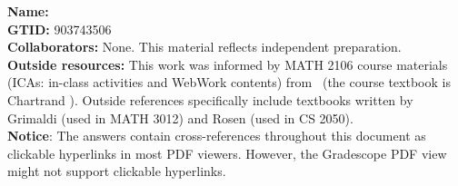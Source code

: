 {\large
  \noindent
  \textbf{Name:} \HandoutAuthor \smallskip \\

  \noindent
  \textbf{GTID:} 903743506 \smallskip \\

  \noindent
  \textbf{Collaborators:} None. This material reflects independent preparation. \smallskip \\

  \noindent
  \textbf{Outside resources:} This work was informed by MATH 2106 course materials 
  (ICAs: in-class activities and WebWork contents) from \HandoutInstitution\ (the course textbook is 
  Chartrand \parencite{chartrand_mathematical_2018}).   
  Outside references specifically include
  textbooks written by 
  Grimaldi \parencite{grimaldi_discrete_2004} (used in MATH 3012) and 
  Rosen \parencite{rosen_discrete_2019} (used in CS 2050). \smallskip \\

  \noindent
  \textbf{Notice}: The answers contain cross-references throughout this document as clickable hyperlinks in most PDF viewers. However, the Gradescope PDF view might not support clickable hyperlinks.
}
